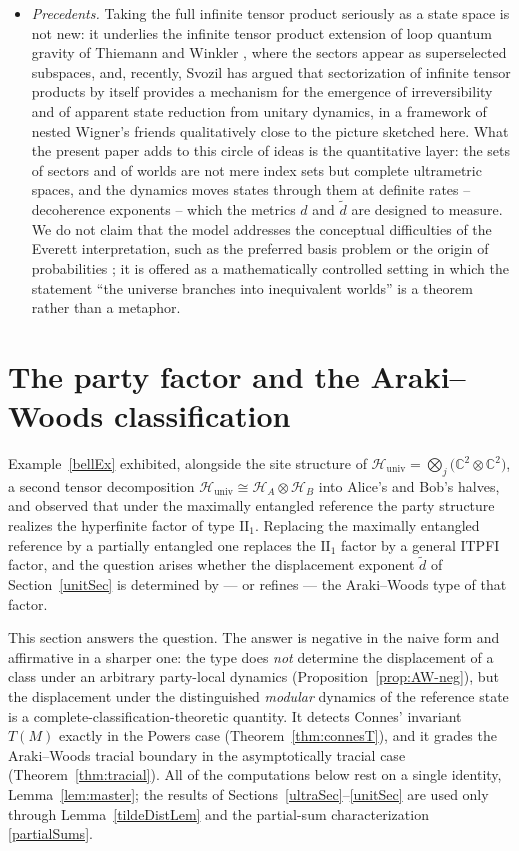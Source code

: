 \documentclass[twoside,11pt,letter]{article}
\def\bC{\mathbb{C}}
\def\cH{{\mathcal{H}}}
\theoremstyle{definition}
\theoremstyle{definition}
\theoremstyle{plain}
\begin{document}
\begin{itemize}
\item[(C)] \textit{Precedents.} Taking the full infinite tensor product seriously as a state space is not new: it underlies the infinite tensor product extension of loop quantum gravity of Thiemann and Winkler \cite{TW01}, where the sectors appear as superselected subspaces, and, recently, Svozil \cite{S26} has argued that sectorization of infinite tensor products by itself provides a mechanism for the emergence of irreversibility and of apparent state reduction from unitary dynamics, in a framework of nested Wigner's friends qualitatively close to the picture sketched here. What the present paper adds to this circle of ideas is the quantitative layer: the sets of sectors and of worlds are not mere index sets but complete ultrametric spaces, and the dynamics moves states through them at definite rates -- decoherence exponents -- which the metrics $d$ and $\tilde d$ are designed to measure. We do not claim that the model addresses the conceptual difficulties of the Everett interpretation, such as the preferred basis problem or the origin of probabilities \cite{W02}; it is offered as a mathematically controlled setting in which the statement ``the universe branches into inequivalent worlds'' is a theorem rather than a metaphor.
\end{itemize}

\section{The party factor and the Araki--Woods classification}
\label{sec:AW}

Example~\ref{bellEx} exhibited, alongside the site structure of $\cH_{\mathrm{univ}} = \bigotimes_j \bigl(\bC^2 \otimes \bC^2\bigr)$, a second tensor decomposition $\cH_{\mathrm{univ}} \cong \cH_A \otimes \cH_B$ into Alice's and Bob's halves, and observed that under the maximally entangled reference the party structure realizes the hyperfinite factor of type $\mathrm{II}_1$. Replacing the maximally entangled reference by a partially entangled one replaces the $\mathrm{II}_1$ factor by a general ITPFI factor, and the question arises whether the displacement exponent $\tilde d$ of Section~\ref{unitSec} is determined by --- or refines --- the Araki--Woods type of that factor.

This section answers the question. The answer is negative in the naive form and affirmative in a sharper one: the type does \emph{not} determine the displacement of a class under an arbitrary party-local dynamics (Proposition~\ref{prop:AW-neg}), but the displacement under the distinguished \emph{modular} dynamics of the reference state is a complete-classification-theoretic quantity. It detects Connes' invariant $T(M)$ exactly in the Powers case (Theorem~\ref{thm:connesT}), and it grades the Araki--Woods tracial boundary in the asymptotically tracial case (Theorem~\ref{thm:tracial}). All of the computations below rest on a single identity, Lemma~\ref{lem:master}; the results of Sections~\ref{ultraSec}--\ref{unitSec} are used only
through Lemma~\ref{tildeDistLem} and the partial-sum characterization \eqref{partialSums}.
\end{document}
